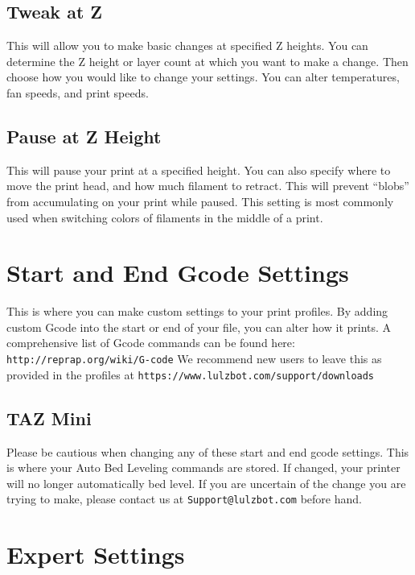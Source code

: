 \subsection{Tweak at Z}

This will allow you to make basic changes at specified Z heights. You can 	determine the Z height or layer count at which you want to make a change. Then choose how you would like to change your settings. You can alter temperatures, fan speeds, and print speeds.

\subsection{Pause at Z Height}

This will pause your print at a specified height. You can also specify where 	to move the print head, and how much filament to retract. This will prevent “blobs” from accumulating on your print while paused. This setting is most commonly used when switching colors of filaments in the middle of a print.

\section{Start and End Gcode Settings}

This is where you can make custom settings to your print profiles. By adding custom Gcode into the start or end of your file, you can alter how it prints. A comprehensive list of Gcode commands can be found here: \texttt{http://reprap.org/wiki/G-code} We recommend new users to leave this as provided in the profiles at \texttt{https://www.lulzbot.com/support/downloads}

\subsection{TAZ Mini}
Please be cautious when changing any of these start and end gcode settings. This is where your Auto Bed Leveling commands are stored. If changed, your printer will no longer 	automatically bed level. If you are uncertain of the change you are trying to make, please contact us at \texttt{Support@lulzbot.com} before hand.

\section{Expert Settings}

